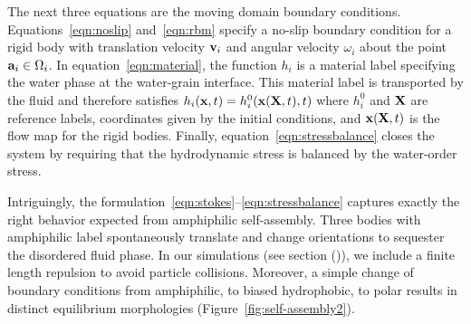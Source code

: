 The next three equations are the moving domain boundary conditions.
Equations~\eqref{eqn:noslip} and~\eqref{eqn:rbm} specify a no-slip
boundary condition for a rigid body with translation velocity $\vv_i$
and angular velocity $\omega_i$ about the point $\aa_i \in \Omega_i$. In
equation~\eqref{eqn:material}, the function $h_i$ is a material label
specifying the water phase at the water-grain interface. This material
label is transported by the fluid and therefore satisfies $h_i(\xx,t) =
h^0_i(\xx(\XX,t),t)$ where $h_i^0$ and $\XX$ are reference labels,
coordinates given by the initial conditions, and $\xx(\XX,t)$ is the
flow map for the rigid bodies. Finally,
equation~\eqref{eqn:stressbalance} closes the system by requiring that
the hydrodynamic stress is balanced by the water-order stress.

Intriguingly, the
formulation~\eqref{eqn:stokes}--\eqref{eqn:stressbalance} captures
exactly the right behavior expected from amphiphilic self-assembly.
Three bodies with amphiphilic label spontaneously translate and change
orientations to sequester the disordered fluid phase. In our simulations
(see section ()), we include a finite length repulsion to avoid particle
collisions. Moreover, a simple change of boundary conditions from
amphiphilic, to biased hydrophobic, to polar results in distinct
equilibrium morphologies (Figure~\ref{fig:self-assembly2}).


